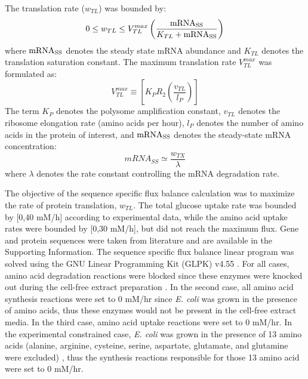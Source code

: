 \documentclass[journal=asbcd6,manuscript=article]{achemso}
\begin{document}
The translation rate ($w_{TL}$) was bounded by:
 \begin{equation}
	0\leq w_{TL} \leq V_{TL}^{max}\left(\frac{\rm mRNA_{SS}}{K_{TL}+\rm mRNA_{SS}}\right)
\end{equation}
where $\rm mRNA_{SS}$ denotes the steady state mRNA abundance and $K_{TL}$ denotes the translation saturation constant.
The maximum translation rate $V_{TL}^{max}$ was formulated as:
\begin{equation}
	V_{TL}^{max} \equiv \left[K_{P} R_{2}\left(\frac{v_{TL}}{l_{P}}\right)\right]
\end{equation}
The term $K_{P}$ denotes the polysome amplification constant,
$v_{TL}$ denotes the ribosome elongation rate (amino acids per hour),
$l_{P}$ denotes the number of amino acids in the protein of interest,
and $\rm mRNA_{SS}$ denotes the steady-state mRNA concentration:
\begin{equation}
	 mRNA_{SS}\simeq\frac{w_{TX}}{\lambda}
\end{equation}
where $\lambda$ denotes the rate constant controlling the mRNA degradation rate.

The objective of the sequence specific flux balance calculation was to maximize the rate of protein translation, $w_{TL}$.
The total glucose uptake rate was bounded by [0,40 mM/h] according to experimental data, while the amino acid uptake rates were bounded by [0,30 mM/h], but did not reach the maximum flux.
Gene and protein sequences were taken from literature and are available in the Supporting Information.
The sequence specific flux balance linear program was solved using the GNU Linear Programming Kit (GLPK) v4.55 \cite{GLPK}.
For all cases, amino acid degradation reactions were blocked since these enzymes were knocked out during the cell-free extract preparation \cite{2005_calhoun_BiotechnologyProgress, Garamella:2016aa}.
In the second case, all amino acid synthesis reactions were set to 0 mM/hr since \textit{E. coli} was grown in the presence of amino acids, thus these enzymes would not be present in the cell-free extract media.
In the third case, amino acid uptake reactions were set to 0 mM/hr.
In the experimental constrained case, \textit{E. coli} was grown in the presence of 13 amino acids (alanine, arginine, cysteine, serine, aspartate, glutamate, and glutamine were excluded) \cite{Zawada:2003}, thus the synthesis reactions responsible for those 13 amino acid were set to 0 mM/hr.
\end{document}
